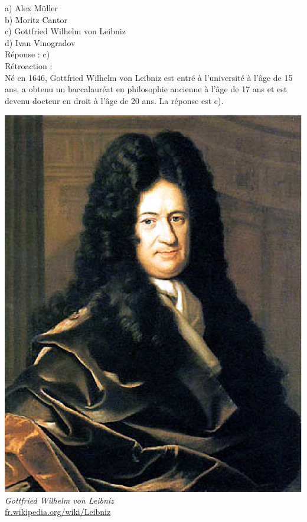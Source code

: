 \documentclass[letterpaper, 12pt]{article}
\begin{document}
a) Alex M\"uller\\
b) Moritz Cantor\\
c) Gottfried Wilhelm von Leibniz\\
d) Ivan Vinogradov\\

R\'eponse : c)\\

R\'etroaction :\\
N\'e en 1646, Gottfried Wilhelm von Leibniz est entr\'e \`a l'universit\'e \`a l'\^age de 15 ans, a obtenu un baccalaur\'eat en philosophie ancienne \`a l'\^age de 17 ans et est devenu docteur en droit \`a l'\^age de 20 ans. La r\'eponse est c).
\begin{center}
\includegraphics[scale=0.25]{Leibniz.eps}\\
\emph{{\small Gottfried Wilhelm von Leibniz}}\\
\href{http://fr.wikipedia.org/wiki/Leibniz}{fr.wikipedia.org/wiki/Leibniz}\\[5mm]
\end{center}
\end{document}

